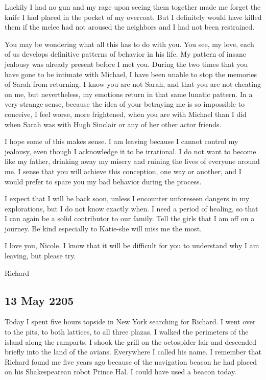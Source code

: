 \documentclass[]{article}
\begin{document}
Luckily I had no gun and my rage upon seeing them together made me forget the knife I had placed in the pocket of my overcoat.  But I definitely would have killed them if the melee had not aroused the neighbors and I had not been restrained.

You may be wondering what all this has to do with you.  You see, my love, each of us develops definitive patterns of behavior in his life.  My pattern of insane jealousy was already present before I met you.  During the two times that you have gone to be intimate with Michael, I have been unable to stop the memories of Sarah from returning.  I know you are not Sarah, and that you are not cheating on me, but nevertheless, my emotions return in that same lunatic pattern.  In a very strange sense, because the idea of your betraying me is so impossible to conceive, I feel worse, more frightened, when you are with Michael than I did when Sarah was with Hugh Sinclair or any of her other actor friends.

I hope some of this makes sense.  I am leaving because I cannot control my jealousy, even though I acknowledge it to be irrational.  I do not want to become like my father, drinking away my misery and ruining the lives of everyone around me.  I sense that you will achieve this conception, one way or another, and I would prefer to spare you my bad behavior during the process.

I expect that I will be back soon, unless I encounter unforeseen dangers in my explorations, but I do not know exactly when.  I need a period of healing, so that I can again be a solid contributor to our family.  Tell the girls that I am off on a journey.  Be kind especially to Katie-she will miss me the most.

I love you, Nicole.  I know that it will be difficult for you to understand why I am leaving, but please try.

Richard

\subsection*{13 May 2205}

Today I spent five hours topside in New York searching for Richard.  I went over to the pits, to both lattices, to all three plazas.  I walked the perimeters of the island along the ramparts.  I shook the grill on the octospider lair and descended briefly into the land of the avians.  Everywhere I called his name.  I remember that Richard found me five years ago because of the navigation beacon he had placed on his Shakespearean robot Prince Hal.  I could have used a beacon today.
\end{document}
